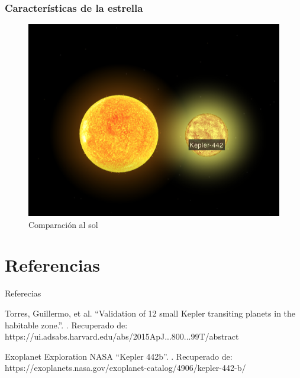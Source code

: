 \documentclass[UKenglish]{beamer}
\begin{document}
\begin{frame}
\frametitle{Características de la estrella}

\begin{figure}[h!]
    \centering
    \includegraphics[scale=0.5]{Imagenes/final.png}
    \caption{Comparación al sol}
    \label{fig:jeje}
    \end{figure}
\end{frame}


\section{Referencias}
\begin{frame}[allowframebreaks]{Referecias}
    \begin{thebibliography}{}

        
        Torres, Guillermo, et al. 
        \newblock \enquote{Validation of 12 small Kepler transiting planets in the habitable zone.}.
        . 
        Recuperado de: https://ui.adsabs.harvard.edu/abs/2015ApJ...800...99T/abstract
        
        Exoplanet Exploration NASA 
        \newblock \enquote{Kepler 442b}.
        .
         Recuperado de: https://exoplanets.nasa.gov/exoplanet-catalog/4906/kepler-442-b/
    

    \end{thebibliography}
\end{frame}
\end{document}
